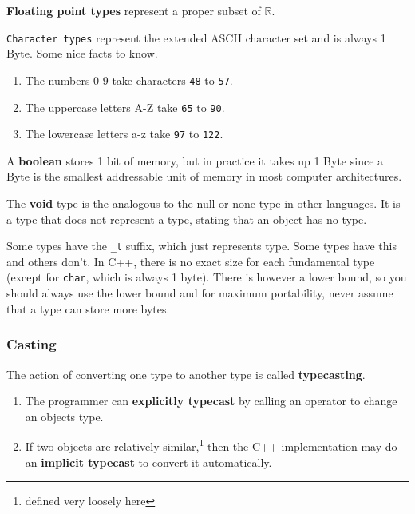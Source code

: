 \documentclass{article}
\begin{document}
    \begin{definition}
      \textbf{Floating point types} represent a proper subset of $\mathbb{R}$. 
    \end{definition}

    \begin{definition}[Char]
      \texttt{Character types} represent the extended ASCII character set and is always 1 Byte. Some nice facts to know. 
      \begin{enumerate}
        \item The numbers 0-9 take characters \texttt{48} to \texttt{57}.
        \item The uppercase letters A-Z take \texttt{65} to \texttt{90}. 
        \item The lowercase letters a-z take \texttt{97} to \texttt{122}. 
      \end{enumerate}
    \end{definition}

    \begin{definition}[Boolean]
      A \textbf{boolean} stores 1 bit of memory, but in practice it takes up 1 Byte since a Byte is the smallest addressable unit of memory in most computer architectures. 
    \end{definition}

    \begin{definition}[Void]
      The \textbf{void} type is the analogous to the null or none type in other languages. It is a type that does not represent a type, stating that an object has no type. 
    \end{definition} 

    \begin{example}
      Some types have the \texttt{\_t} suffix, which just represents type. Some types have this and others don't. In C++, there is no exact size for each fundamental type (except for \texttt{char}, which is always 1 byte). There is however a lower bound, so you should always use the lower bound and for maximum portability, never assume that a type can store more bytes. 
    \end{example}

    \subsubsection{Casting}

      \begin{definition}[Typecasting]
        The action of converting one type to another type is called \textbf{typecasting}. 
        \begin{enumerate}
          \item The programmer can \textbf{explicitly typecast} by calling an operator to change an objects type. 
          \item If two objects are relatively similar,\footnote{defined very loosely here} then the C++ implementation may do an \textbf{implicit typecast} to convert it automatically. 
        \end{enumerate}
      \end{definition} 
\end{document}
